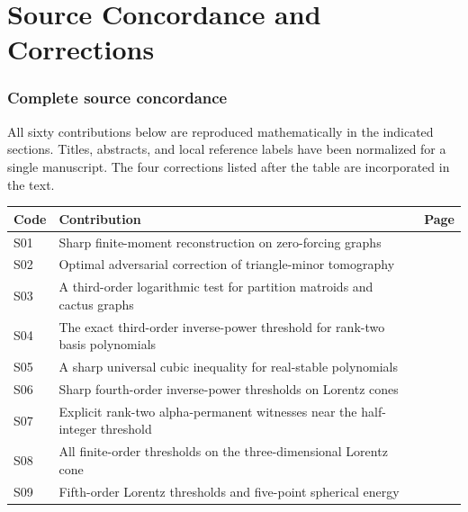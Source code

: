 \documentclass[11pt,a4paper]{article}
\theoremstyle{definition}\newtheorem{definition}[theorem]{Definition}
\theoremstyle{remark}\newtheorem{remark}[theorem]{Remark}
\numberwithin{equation}{section}
\begin{document}
\clearpage\part*{Source Concordance and Corrections}
\section*{Complete source concordance}
All sixty contributions below are reproduced mathematically in the indicated sections. Titles, abstracts, and local reference labels have been normalized for a single manuscript. The four corrections listed after the table are incorporated in the text.
\begin{longtable}{@{}p{}p{}r@{}}
\toprule Code & Contribution & Page\\\midrule\endhead

S01 & Sharp finite-moment reconstruction on zero-forcing graphs & \pageref{contrib-S01}\\

S02 & Optimal adversarial correction of triangle-minor tomography & \pageref{contrib-S02}\\

S03 & A third-order logarithmic test for partition matroids and cactus graphs & \pageref{contrib-S03}\\

S04 & The exact third-order inverse-power threshold for rank-two basis polynomials & \pageref{contrib-S04}\\

S05 & A sharp universal cubic inequality for real-stable polynomials & \pageref{contrib-S05}\\

S06 & Sharp fourth-order inverse-power thresholds on Lorentz cones & \pageref{contrib-S06}\\

S07 & Explicit rank-two alpha-permanent witnesses near the half-integer threshold & \pageref{contrib-S07}\\

S08 & All finite-order thresholds on the three-dimensional Lorentz cone & \pageref{contrib-S08}\\

S09 & Fifth-order Lorentz thresholds and five-point spherical energy & \pageref{contrib-S09}\\


\end{longtable}
\end{document}
